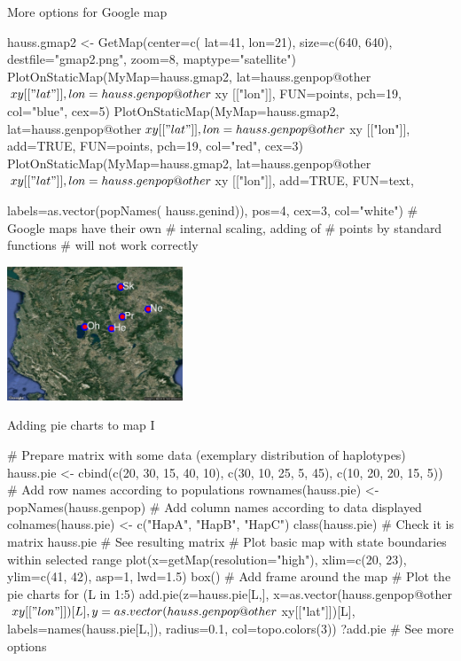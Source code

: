 \documentclass[compress, ucs, xelatex, 11pt, xcolor=svgnames,
  hyperref={
    bookmarks=true,
    unicode=true,
    colorlinks=true,
    pdftitle={Molecular data in R},
    plainpages=false,
    pdfauthor={Vojtech Zeisek},
    pdfsubject={Course about phylogeny and evolution in R},
    pdfcreator={XeLaTeX},
    pdfkeywords={R, evolution, phylogeny, molecular data},
    linkcolor=Tomato,
    anchorcolor=SaddleBrown,
    citecolor=Goldenrod,
    filecolor=DarkMagenta,
    menucolor=Sienna,
    urlcolor=DarkTurquoise,
    pdftex},
  url={hyphens, lowtilde} %
  ]{beamer}
\begin{document}
\begin{frame}[fragile]{More options for Google map}
\begin{multicols}{2}
  \begin{spluscode}
    hauss.gmap2 <- GetMap(center=c(
      lat=41, lon=21), size=c(640,
      640), destfile="gmap2.png",
      zoom=8, maptype="satellite")
    PlotOnStaticMap(MyMap=hauss.gmap2,
      lat=hauss.genpop@other$xy[["lat"
      ]], lon=hauss.genpop@other$xy
      [["lon"]], FUN=points, pch=19,
      col="blue", cex=5)
    PlotOnStaticMap(MyMap=hauss.gmap2,
      lat=hauss.genpop@other$xy[["lat"
      ]], lon=hauss.genpop@other$xy
      [["lon"]], add=TRUE, FUN=points,
      pch=19, col="red", cex=3)
    PlotOnStaticMap(MyMap=hauss.gmap2,
      lat=hauss.genpop@other$xy[["lat"
      ]], lon=hauss.genpop@other$xy
      [["lon"]], add=TRUE, FUN=text,
  \end{spluscode}
  \begin{spluscode}
      labels=as.vector(popNames(
      hauss.genind)), pos=4, cex=3,
      col="white")
    # Google maps have their own
    # internal scaling, adding of
    # points by standard functions
    # will not work correctly
  \end{spluscode}
  \begin{center}
   \includegraphics[height=4cm]{gmap.jpg}
  \end{center}
\end{multicols}
\end{frame}

\begin{frame}[fragile]{Adding pie charts to map I}
  \begin{spluscode}
    # Prepare matrix with some data (exemplary distribution of haplotypes)
    hauss.pie <- cbind(c(20, 30, 15, 40, 10), c(30, 10, 25, 5, 45),
      c(10, 20, 20, 15, 5))
    # Add row names according to populations
    rownames(hauss.pie) <- popNames(hauss.genpop)
    # Add column names according to data displayed
    colnames(hauss.pie) <- c("HapA", "HapB", "HapC") 
    class(hauss.pie) # Check it is matrix
    hauss.pie # See resulting matrix
    # Plot basic map with state boundaries within selected range
    plot(x=getMap(resolution="high"), xlim=c(20, 23), ylim=c(41, 42),
      asp=1, lwd=1.5)
    box() # Add frame around the map
    # Plot the pie charts
    for (L in 1:5) { add.pie(z=hauss.pie[L,], x=as.vector(hauss.genpop@other
      $xy[["lon"]])[L], y=as.vector(hauss.genpop@other$xy[["lat"]])[L],
      labels=names(hauss.pie[L,]), radius=0.1, col=topo.colors(3)) }
    ?add.pie # See more options
  \end{spluscode}
\end{frame}
\end{document}
